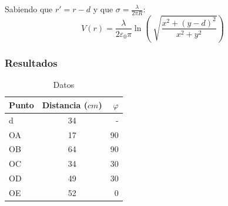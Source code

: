\documentclass{article}
\begin{document}
    Sabiendo que $ r' = r - d$ y que $\sigma = 
    \frac{\lambda}{2 \pi R}$:
    \begin{equation}
		V(r) = \frac{\lambda}{2 \varepsilon_0 \pi} \ln \left({\sqrt[]{\frac{x^2 + (y-d)^2}{x^2 + y^2}}}\right)
	\end{equation}
    

\subsubsection{Resultados}
	\begin{table}[H]
    \centering
    \begin{tabular}{|l | c | r|}
    	\hline
		Punto & Distancia ($cm$) & $ \varphi $ \\ \hline
        d & 34 & - \\
        OA & 17 & 90 \\
        OB & 64 & 90 \\
        OC & 34 & 30 \\
        OD & 49 & 30 \\
        OE & 52 & 0 \\ \hline
	\end{tabular}
    \caption{Datos}
    \end{table}

	
\end{document}
